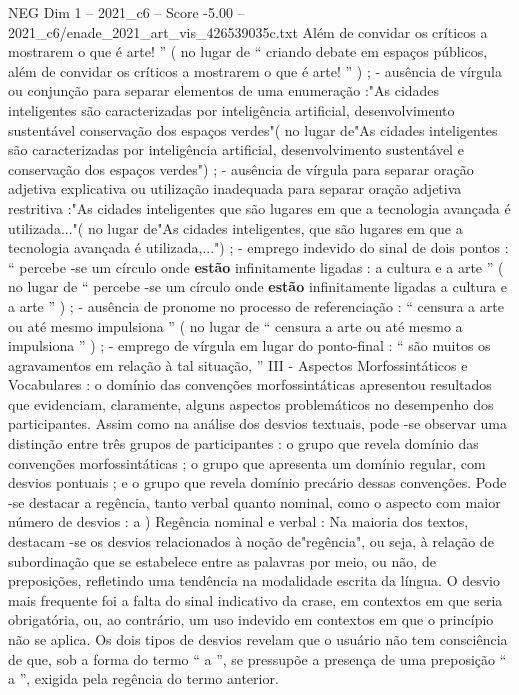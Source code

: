 \begin{textsample}{NEG Dim 1 – 2021\_c6 – Score -5.00 – 2021\_c6/enade\_2021\_art\_vis\_426539035c.txt}
Além de convidar os críticos a mostrarem o que é arte! ” ( no lugar de “ criando debate em espaços públicos, além de convidar os críticos a mostrarem o que é arte! ” ) ; - ausência de vírgula ou conjunção para separar elementos de uma enumeração :"As cidades inteligentes são caracterizadas por inteligência artificial, desenvolvimento sustentável conservação dos espaços verdes"( no lugar de"As cidades inteligentes são caracterizadas por inteligência artificial, desenvolvimento sustentável e conservação dos espaços verdes") ; - ausência de vírgula para separar oração adjetiva explicativa ou utilização inadequada para separar oração adjetiva restritiva :"As cidades inteligentes que são lugares em que a tecnologia avançada é utilizada..."( no lugar de"As cidades inteligentes, que são lugares em que a tecnologia avançada é utilizada,...") ; - emprego indevido do sinal de dois pontos : “ percebe -se um círculo onde \textbf{estão} infinitamente ligadas : a cultura e a arte ” ( no lugar de “ percebe -se um círculo onde \textbf{estão} infinitamente ligadas a cultura e a arte ” ) ; - ausência de pronome no processo de referenciação : “ censura a arte ou até mesmo impulsiona ” ( no lugar de “ censura a arte ou até mesmo a impulsiona ” ) ; - emprego de vírgula em lugar do ponto-final : “ são muitos os agravamentos em relação à tal situação, ” III - Aspectos Morfossintáticos e Vocabulares : o domínio das convenções morfossintáticas apresentou resultados que evidenciam, claramente, alguns aspectos problemáticos no desempenho dos participantes.
Assim como na análise dos desvios textuais, pode -se observar uma distinção entre três grupos de participantes : o grupo que revela domínio das convenções morfossintáticas ; o grupo que apresenta um domínio regular, com desvios pontuais ; e o grupo que revela domínio precário dessas convenções.
Pode -se destacar a regência, tanto verbal quanto nominal, como o aspecto com maior número de desvios : a ) Regência nominal e verbal : Na maioria dos textos, destacam -se os desvios relacionados à noção de"regência", ou seja, à relação de subordinação que se estabelece entre as palavras por meio, ou não, de preposições, refletindo uma tendência na modalidade escrita da língua.
O desvio mais frequente foi a falta do sinal indicativo da crase, em contextos em que seria obrigatória, ou, ao contrário, um uso indevido em contextos em que o princípio não se aplica.
Os dois tipos de desvios revelam que o usuário não tem consciência de que, sob a forma do termo “ a ”, se pressupõe a presença de uma preposição “ a ”, exigida pela regência do termo anterior.

\end{textsample}
